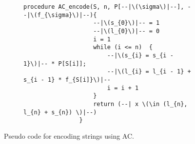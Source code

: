 \documentclass{subfiles}
\begin{document}
    \begin{figure}[!ht]
        \centering
        \begin{subfigure}{0.5\textwidth}
            \begin{lstlisting}[language=PSEUDO]
                procedure AC_encode(S, n, P[--|\(\sigma\)|--], --|\(f_{\sigma}\)|--){
                    --|\(s_{0}\)|-- = 1
                    --|\(l_{0}\)|-- = 0
                    i = 1
                    while (i <= n)  {
                        --|\(s_{i} = s_{i - 1}\)|-- * P[S[i]];
                        --|\(l_{i} = l_{i - 1} + s_{i - 1} * f_{S[i]}\)|--
                        i = i + 1
                    }
                    return (--| x \(\in (l_{n}, l_{n} + s_{n}) \)|--)
                }
            \end{lstlisting}
        \end{subfigure}
        \caption{Pseudo code for encoding strings using AC.}
        \label{Fig:3}
    \end{figure}
\end{document}
